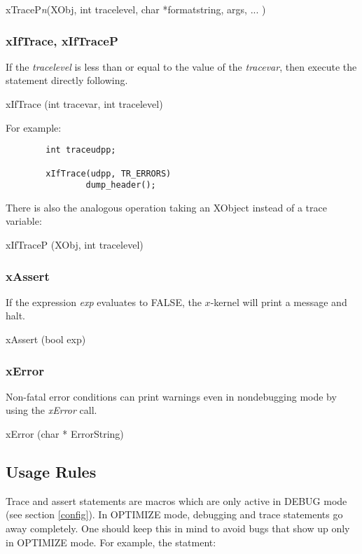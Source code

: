 \medskip

{\bold xTraceP}{\em n}({\sem XObj}, {\sem int} {\caps
tracelevel}, {\sem char} *{\caps formatstring}, {\caps args, ...} )
\medskip


\subsubsection{xIfTrace, xIfTraceP}

If the {\em tracelevel} is less than or equal to the value of the {\em
tracevar}, then execute the statement directly following.
\smallskip

{\bold xIfTrace} ({\sem int} {\caps tracevar}, {\sem int} {\caps tracelevel})

\medskip
\noindent For example:

\begin{verbatim}
        int traceudpp;

        xIfTrace(udpp, TR_ERRORS) 
                dump_header();
\end{verbatim}

\noindent
There is also the analogous operation taking an XObject
instead of a trace variable:
\medskip

{\bold xIfTraceP} ({\sem XObj}, {\sem int} {\caps tracelevel})

\subsubsection{xAssert}

If the expression {\em exp} evaluates to FALSE, the $x$-kernel will
print a message and halt.
\medskip

{\bold xAssert} ({\sem bool} {\caps exp})

\subsubsection{xError}

Non-fatal error conditions can print warnings even in nondebugging
mode by using the {\em xError} call.
\medskip

{\bold xError} ({\sem char *} {\caps ErrorString})

\subsection{Usage Rules}

Trace and assert statements are macros which are only active in DEBUG
mode (see section \ref{config}).  In OPTIMIZE mode, debugging and
trace statements go away completely.  One should keep this in mind to
avoid bugs that show up only in OPTIMIZE mode.  For example, the
statment:

